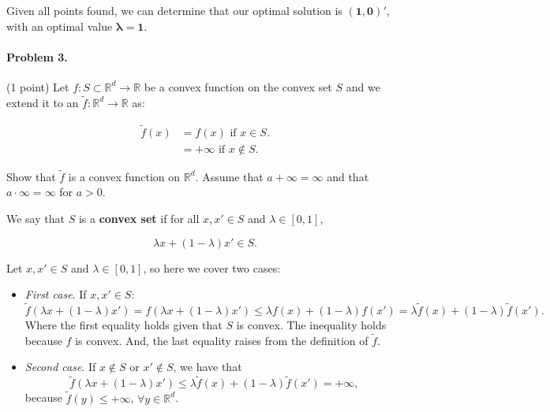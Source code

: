\documentclass[12pt]{scrartcl}
\begin{document}
Given all points found, we can determine that our optimal solution is $\mathbf{(1, 0)'}$, with an optimal value $\mathbf{\lambda=1}$.

\vspace{0.5em}






\begin{boxF}
\paragraph*{Problem 3.} (1 point) \hspace{0.15em} Let $f : S \subset \mathbb{R}^d \to \mathbb{R}$ be a convex function on the convex set $S$ and we extend it to an $\tilde f : \mathbb{R}^d \to \mathbb{R}$ as:

    \begin{align*}
        \tilde f(x) &= f(x) \mbox{ if } x \in S. \\
                    &= +\infty \mbox{ if } x \notin S.
    \end{align*}

Show that $\tilde f$ is a convex function on $\mathbb{R}^d$. Assume that $a + \infty = \infty $ and that $ a \cdot \infty = \infty$ for $a > 0$.
\end{boxF}

We say that $S$ is a \textbf{convex set} if for all $x, x' \in S$ and $\lambda \in [0,1]$,

\begin{equation*}
    \lambda x + (1 - \lambda) x' \in S.
\end{equation*}

Let $x, x' \in S$ and $\lambda \in [0,1]$, so here we cover two cases:

\begin{itemize}
    \item \textit{First case}. If $x, x' \in S$:
    \begin{equation*}
        \tilde f (\lambda x + (1- \lambda)x') = f (\lambda x + (1- \lambda)x')  \leq \lambda f(x) + (1-\lambda)f(x') = \lambda \tilde f(x) + (1-\lambda)\tilde f(x').
    \end{equation*}
    Where the first equality holds given that $S$ is convex. The inequality holds because $f$ is convex. And, the last equality raises from the definition of $\tilde f$.

    \item \textit{Second case}. If $x \notin S$ or $x' \notin S$, we have that
    \begin{equation*}
        \tilde f (\lambda x + (1- \lambda)x') \leq \lambda \tilde f (x) + (1 - \lambda) \tilde f (x') = + \infty,
    \end{equation*}
    because $\tilde f (y) \leq + \infty$, $\forall y \in \mathbb{R}^d$.
\end{itemize}
\end{document}

